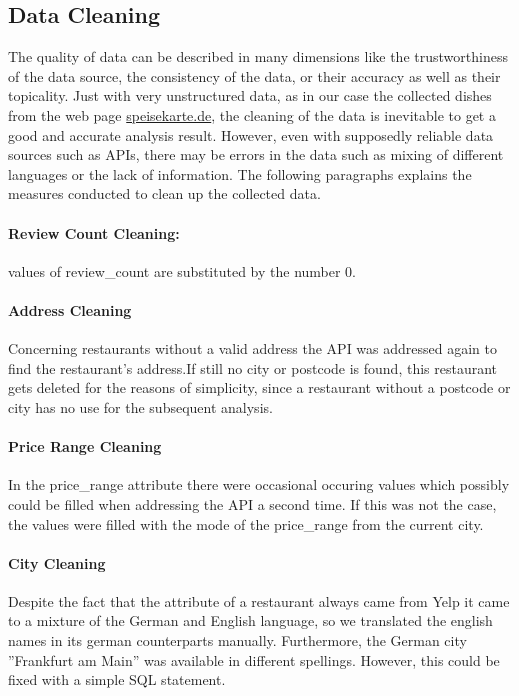 \subsection{Data Cleaning}
\label{subsec:cleaning}
The quality of data can be described in many dimensions like the trustworthiness of the data source, the consistency of the data,
or their accuracy as well as their topicality.%
Just with very unstructured data, as in our case the collected dishes from the web page \url{speisekarte.de}, the cleaning of the data is
inevitable to get a good and accurate analysis result. %
However, even with supposedly reliable data sources such as \acp{API}, there may be errors in the data such as mixing of different languages or the lack of information.
\newline
The following paragraphs explains the measures conducted to clean up the collected data.
\paragraph{Review Count Cleaning:}  values of review\_count are substituted by the number 0.
\paragraph{Address Cleaning}
Concerning restaurants without a valid address the \ylp{} \ac{API} was addressed again to find the restaurant's address.If still no city or postcode is found, this restaurant gets deleted for the reasons of simplicity, since a restaurant without a postcode or city has no use for the subsequent analysis.
\paragraph{Price Range Cleaning}
In the price\_range attribute there were occasional occuring  values which possibly could be filled when addressing the \ylp{} \ac{API} a second time.
If this was not the case, the  values were filled with the mode of the price\_range from the current city.
\paragraph{City Cleaning}
Despite the fact that the  attribute of a restaurant always came from Yelp it came to a mixture of the German and English language,
so we translated the english names in its german counterparts manually.
Furthermore, the German city ''Frankfurt am Main'' was available in different spellings.
However, this could be fixed with a simple \ac{SQL} statement.
